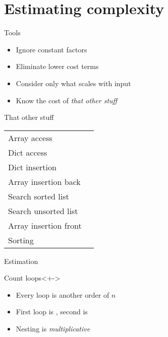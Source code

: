 \documentclass[pdf]{beamer}
\begin{document}
\section{Estimating complexity}
\tableofcontents[currentsection]

\begin{frame}
    \begin{block}{Tools}
        \begin{itemize}[<+->]
            \item Ignore constant factors
            \item Eliminate lower cost terms
            \item Consider only what scales with input
            \item Know the cost of \emph{that other stuff}
        \end{itemize}
    \end{block}
\end{frame}

\begin{frame}{That other stuff}
    \only<+->{}
    \begin{tabular}{l | l}
        Array access            & \only<+->{\color[rgb]{0, 0.6, 0}{$O(1)$}}  \\
        Dict access             & \only<+->{\color[rgb]{0, 0.6, 0}{$O(1)$}}  \\
        Dict insertion          & \only<+->{\color[rgb]{0, 0.6, 0}{$O(1)$}}  \\
        Array insertion back    & \only<+->{\color[rgb]{0, 0.6, 0}{$O(1)$}}  \\
        Search sorted list      & \only<+->{\color[rgb]{0, 0.6, 0}{\Ologn}}  \\
        Search unsorted list    & \only<+->{\color[rgb]{0, 0.6, 0}{\On}}     \\
        Array insertion front   & \only<+->{\color[rgb]{0, 0.6, 0}{\On}}     \\
        Sorting                 & \only<+->{\color[rgb]{0, 0.6, 0}{\Onlogn}} \\
    \end{tabular}
\end{frame}

\begin{frame}{Estimation}
    \begin{block}{Count loops}<+->
        \begin{itemize}[<+->]
            \item Every loop is another order of $n$
            \item First loop is \On, second is 
            \item Nesting is \emph{multiplicative}
        \end{itemize}
    \end{block}

\end{frame}
\end{document}
